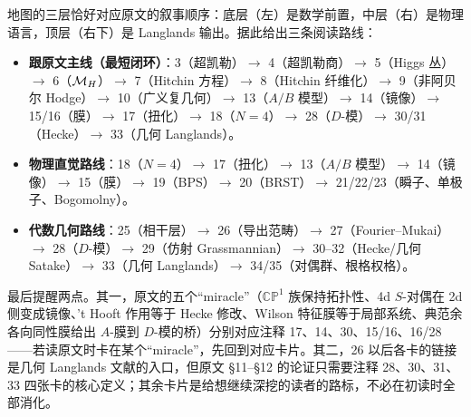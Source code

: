 \begin{center}
\end{center}

地图的三层恰好对应原文的叙事顺序：底层（左）是数学前置，中层（右）是物理语言，顶层（右下）是 Langlands 输出。据此给出三条阅读路线：

\begin{itemize}
\item \textbf{跟原文主线（最短闭环）}：3（超凯勒）$\to$ 4（超凯勒商）$\to$ 5（Higgs 丛）$\to$ 6（$\mathcal{M}_H$）$\to$ 7（Hitchin 方程）$\to$ 8（Hitchin 纤维化）$\to$ 9（非阿贝尔 Hodge）$\to$ 10（广义复几何）$\to$ 13（$A/B$ 模型）$\to$ 14（镜像）$\to$ 15/16（膜）$\to$ 17（扭化）$\to$ 18（$N=4$）$\to$ 28（$D$-模）$\to$ 30/31（Hecke）$\to$ 33（几何 Langlands）。
\item \textbf{物理直觉路线}：18（$N=4$）$\to$ 17（扭化）$\to$ 13（$A/B$ 模型）$\to$ 14（镜像）$\to$ 15（膜）$\to$ 19（BPS）$\to$ 20（BRST）$\to$ 21/22/23（瞬子、单极子、Bogomolny）。
\item \textbf{代数几何路线}：25（相干层）$\to$ 26（导出范畴）$\to$ 27（Fourier--Mukai）$\to$ 28（$D$-模）$\to$ 29（仿射 Grassmannian）$\to$ 30--32（Hecke/几何 Satake）$\to$ 33（几何 Langlands）$\to$ 34/35（对偶群、根格权格）。
\end{itemize}

最后提醒两点。其一，原文的五个“miracle”（$\mathbb{CP}^1$ 族保持拓扑性、4d $S$-对偶在 2d 侧变成镜像、't Hooft 作用等于 Hecke 修改、Wilson 特征膜等于局部系统、典范余各向同性膜给出 $A$-膜到 $D$-模的桥）分别对应注释 17、14、30、15/16、16/28——若读原文时卡在某个“miracle”，先回到对应卡片。其二，26 以后各卡的链接是几何 Langlands 文献的入口，但原文 §11--§12 的论证只需要注释 28、30、31、33 四张卡的核心定义；其余卡片是给想继续深挖的读者的路标，不必在初读时全部消化。

